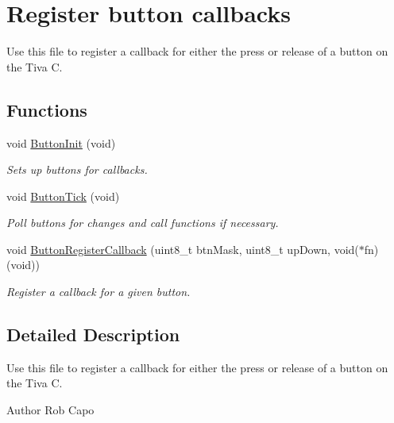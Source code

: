 \hypertarget{group__button}{\section{Register button callbacks}
\label{group__button}
}


Use this file to register a callback for either the press or release of a button on the Tiva C.  


\subsection*{Functions}
\begin{DoxyCompactItemize}
\item 
\hypertarget{group__button_ga30a1cff81be3c91e307685387401e863}{void \hyperlink{group__button_ga30a1cff81be3c91e307685387401e863}{Button\+Init} (void)}\label{group__button_ga30a1cff81be3c91e307685387401e863}

\begin{DoxyCompactList}\small\item\em Sets up buttons for callbacks. \end{DoxyCompactList}\item 
void \hyperlink{group__button_ga5ccbbc67c97ca1e47afafbdd33de8cb2}{Button\+Tick} (void)
\begin{DoxyCompactList}\small\item\em Poll buttons for changes and call functions if necessary. \end{DoxyCompactList}\item 
void \hyperlink{group__button_ga59998b72a9be439b89f19510b73eafef}{Button\+Register\+Callback} (uint8\+\_\+t btn\+Mask, uint8\+\_\+t up\+Down, void($\ast$fn)(void))
\begin{DoxyCompactList}\small\item\em Register a callback for a given button. \end{DoxyCompactList}\end{DoxyCompactItemize}


\subsection{Detailed Description}
Use this file to register a callback for either the press or release of a button on the Tiva C. 

\begin{DoxyAuthor}{Author}
Rob Capo 
\end{DoxyAuthor}


